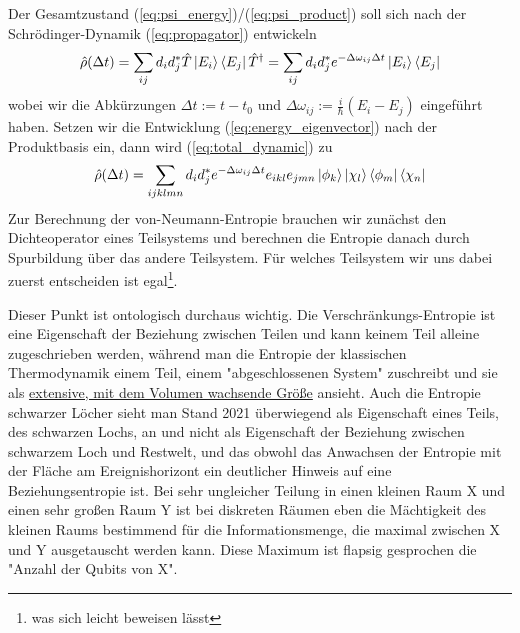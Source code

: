 \documentclass[12pt]{article}
\begin{document}
Der Gesamtzustand (\ref{eq:psi_energy})/(\ref{eq:psi_product}) soll sich nach der Schrödinger-Dynamik (\ref{eq:propagator}) entwickeln
\begin{equation}
\label{eq:total_dynamic}
\hat{\rho}(\Delta t)=\sum_{ij}d_{i}d_{j}^*\hat{T}\ket{E_i}\bra{E_j}{\hat{T}}^\dagger
= \sum_{ij}d_{i}d_{j}^* e^{-\Delta\omega_{ij}\Delta t} \ket{E_i}\bra{E_j}
\end{equation}
wobei wir die Abkürzungen $\Delta t := t-t_0$ und $\Delta \omega_{ij} := \frac{i}{\hbar}(E_i - E_j)$ eingeführt haben. Setzen wir die Entwicklung (\ref{eq:energy_eigenvector}) nach der Produktbasis ein, dann wird  (\ref{eq:total_dynamic}) zu 
\begin{equation*}
\hat{\rho}(\Delta t) = \sum_{ijklmn}d_{i}d_{j}^* e^{-\Delta\omega_{ij}\Delta t} 
e_{ikl}e_{jmn}\ket{\phi_k}\ket{\chi_l}\bra{\phi_m}\bra{\chi_n}
\end{equation*}
Zur Berechnung der von-Neumann-Entropie brauchen wir zunächst den Dichteoperator eines Teilsystems und berechnen die Entropie danach durch Spurbildung über das andere Teilsystem. Für welches Teilsystem wir uns dabei zuerst entscheiden ist egal\footnote{was sich leicht beweisen lässt}. 

Dieser Punkt ist ontologisch durchaus wichtig. Die Verschränkungs-Entropie ist eine Eigenschaft der Beziehung zwischen Teilen und kann keinem Teil alleine zugeschrieben werden, während man die Entropie der klassischen Thermodynamik einem Teil, einem "abgeschlossenen System" zuschreibt und sie als \href{https://de.wikipedia.org/wiki/Extensive_Gr%C3%B6%C3%9Fe}{extensive, mit dem Volumen wachsende Größe} ansieht. Auch die Entropie schwarzer Löcher sieht man Stand 2021 überwiegend als Eigenschaft eines Teils, des schwarzen Lochs, an und nicht als Eigenschaft der Beziehung zwischen schwarzem Loch und Restwelt, und das obwohl das Anwachsen der Entropie mit der Fläche am Ereignishorizont ein deutlicher Hinweis auf eine Beziehungsentropie ist. Bei sehr ungleicher Teilung in einen kleinen Raum X und einen sehr großen Raum Y ist bei diskreten Räumen eben die Mächtigkeit des kleinen Raums bestimmend für die Informationsmenge, die maximal zwischen X und Y ausgetauscht werden kann. Diese Maximum ist flapsig gesprochen die "Anzahl der Qubits von X".
\end{document}
